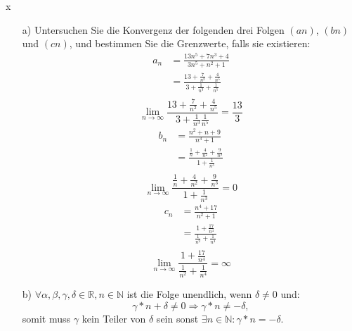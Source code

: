 \documentclass{problemset}
\begin{document}
\begin{problem}{x}
\begin{enumerate}
    \item [a)] Untersuchen Sie die Konvergenz der folgenden drei Folgen $(an)$, $(bn)$ und $(cn)$, und
          bestimmen Sie die Grenzwerte, falls sie existieren:
          \begin{align*}
              a_n & = \frac{13n^5 +7n^3 +4}{3n^5 + n^2 + 1}                                        \\
                  & = \frac{13 + \frac{7}{n^2} + \frac{4}{n^5}}{3 + \frac{1}{n^3} + \frac{1}{n^5}} \\
          \end{align*}
          \begin{displaymath}
              \lim_{n \rightarrow \infty} \frac{13 + \frac{7}{n^2} + \frac{4}{n^5}}{3 + \frac{1}{n^3} \frac{1}{n^5}} = \frac{13}{3}
          \end{displaymath}
          \begin{align*}
              b_n & = \frac{n^2 + n + 9}{n^3 +1}                                            \\
                  & = \frac{\frac{1}{n} + \frac{4}{n^2} + \frac{9}{n^3}}{1 + \frac{1}{n^3}} \\
          \end{align*}
          \begin{displaymath}
              \lim_{n \rightarrow \infty} \frac{\frac{1}{n} + \frac{4}{n^2} + \frac{9}{n^3}}{1 + \frac{1}{n^3}} = 0
          \end{displaymath}
          \begin{align*}
              c_n & = \frac{n^4 + 17}{n^2 + 1}                                 \\
                  & = \frac{1 + \frac{17}{n^4}}{\frac{1}{n^2} + \frac{1}{n^4}} \\
          \end{align*}
          \begin{displaymath}
              \lim_{n \rightarrow \infty} \frac{1 + \frac{17}{n^4}}{\frac{1}{n^2} + \frac{1}{n^4}} = \infty
          \end{displaymath}
    \item [b)]
          $\forall \alpha,\beta,\gamma,\delta \in \mathbb{R},n \in \mathbb{N}$ ist die Folge unendlich, wenn $\delta \ne 0$ und: \[
              \gamma * n + \delta \ne 0 \Rightarrow \gamma * n \ne -\delta,
          \] somit muss $\gamma$ kein Teiler von $\delta$ sein sonst $\exists n
             \in \mathbb{N}: \gamma * n = -\delta$.
\end{enumerate}
\end{problem}
\end{document}
